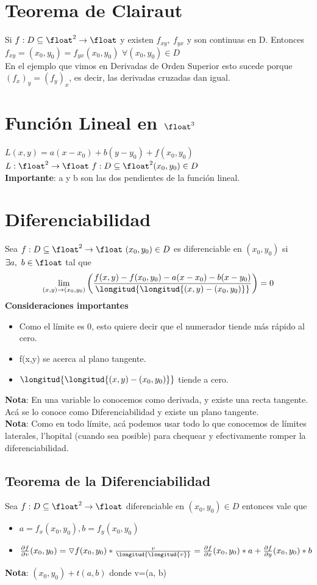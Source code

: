 \documentclass[10pt,a4paper]{article}
\begin{document}
\section*{Teorema de Clairaut}
Si $f:D \subseteq \float^{2} \rightarrow \float$ y existen $f_{xy}, \ f_{yx}$ y son continuas en D. Entonces $f_{xy}=(x_{0}, y_{0}) = f_{yx}(x_{0}, y_{0})$ $\forall(x_{0}, y_{0}) \in D$ \\
En el ejemplo que vimos en Derivadas de Orden Superior esto sucede porque $(f_{x})_{y} = (f_{y})_{x}$, es decir, las derivadas cruzadas dan igual.
\section*{Función Lineal en $\float^{3}$}
$L(x,y) = a(x-x_{0}) + b(y-y_{0})+f(x_{0}, y_{0})$ \\
$L:\float^{2} \rightarrow \float \ f:D\subseteq \float^{2} (x_{0}, y_{0}) \in D$ \\
\textbf{Importante}: a y b son las dos pendientes de la función lineal.
\section*{Diferenciabilidad}
Sea $f:D \subseteq \float^{2} \rightarrow \float \ (x_{0}, y_{0}) \in D$ es diferenciable en $(x_{0}, y_{0})$ si $\exists a,\ b \in \float$ tal que 
\[\lim_{(x,y) \to (x_{0}, y_{0})} \left(\frac{f(x, y) - f(x_{0}, y_{0}) - a(x - x_{0}) - b(x - y_{0})}{\longitud{\longitud{(x, y) - (x_{0}, y_{0})}}} \right) = 0\]
\textbf{Consideraciones importantes}
\begin{itemize}
    \item Como el límite es 0, esto quiere decir que el numerador tiende más rápido al cero.
    \item f(x,y) se acerca al plano tangente.
    \item $\longitud{\longitud{(x,y) - (x_{0}, y_{0})}}$ tiende a cero. 
\end{itemize}
\textbf{Nota}: En una variable lo conocemos como derivada, y existe una recta tangente. Acá se lo conoce como Diferenciabilidad y existe un plano tangente. \\
\textbf{Nota}: Como en todo límite, acá podemos usar todo lo que conocemos de límites laterales, l'hopital (cuando sea posible) para chequear y efectivamente romper la diferenciabilidad. \\
\subsection*{Teorema de la Diferenciabilidad}
Sea $f:D \subseteq \float^{2} \rightarrow \float$ diferenciable en $(x_{0}, y_{0}) \in D$ entonces vale que 
\begin{itemize}
    \item $a = f_{x}(x_{0}, y_{0}), b = f_{y}(x_{0}, y_{0})$
    \item $ \frac{\partial f}{\partial v}(x_{0},y_{0}) = \triangledown f (x_{0}, y_{0}) * \frac{v}{\longitud{\longitud{v}}} = \frac{\partial f}{\partial x}(x_{0}, y_{0}) * a + \frac{\partial f}{\partial y}(x_{0}, y_{0})*b$
\end{itemize} 
\textbf{Nota}: $(x_{0}, y_{0}) + t(a,b)$ donde v=(a, b) 
\end{document}
